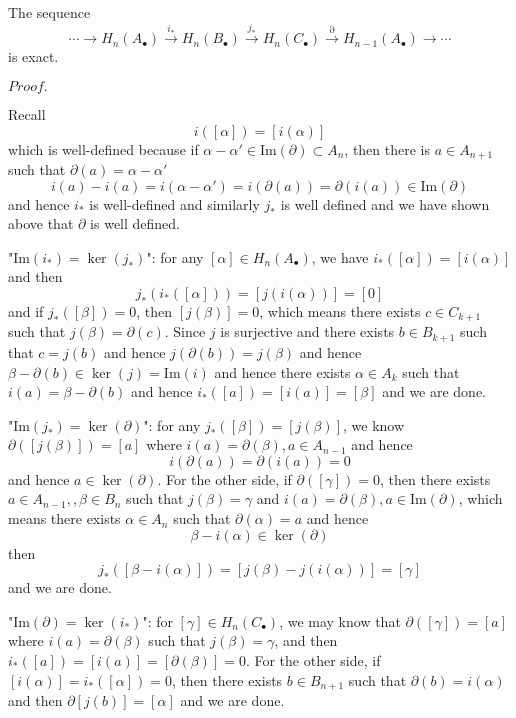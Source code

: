 \documentclass{article}
\newcommand{\Pf}[1]{$Proof.$\par}
\begin{document}
\begin{theorem}
    The sequence
    \[\cdots \rightarrow H_n(A_{\bullet}) \overset{i_*}{\rightarrow} H_n(B_{\bullet}) \overset{j_*}{\rightarrow} H_n(C_{\bullet}) \overset{\partial}{\rightarrow} H_{n-1}(A_{\bullet})\to \cdots\]
    is exact.\par
\end{theorem}
\Pf\par
    Recall
    \[
    i([\alpha]) = [i(\alpha)]
    \]
    which is well-defined because if $\alpha - \alpha' \in \text{Im}(\partial) \subset A_n$, then there is $a \in A_{n+1}$ such that $\partial(a) = \alpha - \alpha'$
    \[
    i(a) - i(a) = i(\alpha-\alpha') = i(\partial(a)) = \partial(i(a)) \in \text{Im}(\partial)
    \]
    and hence $i_*$ is well-defined and similarly $j_*$ is well defined and we have shown above that $\partial$ is well defined.\par
    "$\text{Im}(i_*) = \ker(j_*)$": for any $[\alpha] \in H_n(A_{\bullet})$, we have $i_*([\alpha]) = [i(\alpha)]$ and then
    \[
    j_*(i_*([\alpha])) = [j(i(\alpha))] = [0]
    \]
    and if $j_*([\beta]) = 0$, then $[j(\beta)] = 0$, which means there exists $c\in C_{k+1}$ such that $j(\beta) = \partial(c)$. Since $j$ is surjective and there exists $b\in B_{k+1}$ such that $c = j(b)$ and hence $j(\partial(b)) = j(\beta)$ and hence $\beta - \partial(b) \in \ker(j) = \text{Im}(i) $ and hence there exists $\alpha \in A_k$ such that $i(a) = \beta - \partial(b)$ and hence $i_*([a]) = [i(a)] = [\beta]$ and we are done.\par
    "$\text{Im}(j_*) = \ker(\partial)$": for any $j_*([\beta]) = [j(\beta)]$, we know $\partial([j(\beta)]) = [a]$ where $i(a) = \partial(\beta), a\in A_{n-1}$ and hence
    \[
    i(\partial(a)) = \partial(i(a)) = 0
    \]
    and hence $a\in \ker(\partial)$. For the other side, if $\partial([\gamma]) = 0$, then there exists $a\in A_{n-1},,\beta\in B_n$ such that $j(\beta) = \gamma$ and $i(a) = \partial(\beta), a\in \text{Im}(\partial)$, which means there exists $\alpha \in A_{n}$ such that $\partial(\alpha) = a$ and hence
    \[
    \beta - i(\alpha) \in \ker(\partial)
    \]
    then
    \[
    j_*([\beta - i(\alpha)]) = [j(\beta) - j(i(\alpha))] = [\gamma]
    \]
    and we are done.\par
    "$\text{Im}(\partial) = \ker(i_*)$": for $[\gamma] \in H_n(C_{\bullet})$, we may know that $\partial([\gamma]) = [a]$ where $i(a) = \partial(\beta)$ such that $j(\beta) = \gamma$, and then $i_*([a]) = [i(a)] = [\partial(\beta)] = 0$. For the other side, if $[i(\alpha)] = i_*([\alpha]) = 0$, then there exists $b\in B_{n+1}$ such that $\partial(b) = i(\alpha)$ and then $\partial[j(b)] = [\alpha]$ and we are done.
\end{document}
